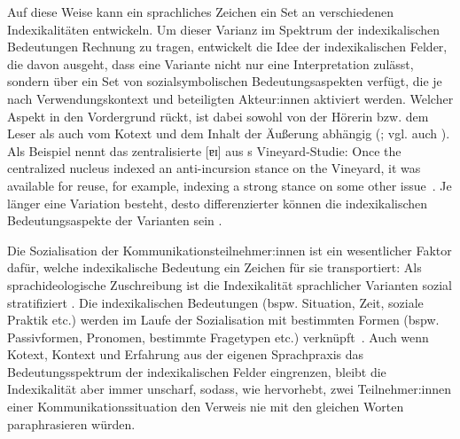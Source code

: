 Auf diese Weise kann ein sprachliches Zeichen ein Set an verschiedenen Indexikalitäten entwickeln. 
Um dieser Varianz im Spektrum der indexikalischen Bedeutungen Rechnung zu tragen, entwickelt \citet{Eckert2008} die Idee der indexikalischen Felder, die davon ausgeht, dass eine Variante nicht nur eine Interpretation zulässt, sondern über ein Set von sozialsymbolischen Bedeutungsaspekten verfügt, die je nach Verwendungskontext und beteiligten Akteur:innen aktiviert werden. 
Welcher Aspekt in den Vordergrund rückt, ist dabei sowohl von der Hörerin bzw. dem Leser als auch vom Kotext und dem Inhalt der Äußerung abhängig (\citealp[s.][466]{Eckert2008}; vgl. auch \cites[45]{Gumperz.1992b}[414]{Ochs1996}). 
Als Beispiel nennt \citet[72]{Eckert.2016} das zentralisierte [ɐɪ] aus \citeauthor{Labov1963}s \citeyear{Labov1963} Vineyard-Studie: {\glqq}Once the centralized nucleus indexed an anti-incursion stance on the Vineyard, it was available for reuse, for example, indexing a strong stance on some other issue{\grqq}~\citep[72]{Eckert.2016}.
Je länger eine Variation besteht, desto differenzierter können die indexikalischen Bedeutungsaspekte der Varianten sein \citep[s.][471]{Eckert2008}.

Die Sozialisation der Kommunikationsteilnehmer:innen ist ein wesentlicher Faktor dafür, welche indexikalische Bedeutung ein Zeichen für sie transportiert: 
Als sprachideologische Zuschreibung ist die Indexikalität sprachlicher Varianten sozial stratifiziert \citep[s.][265]{Spitzmuller2013}. 
Die indexikalischen Bedeutungen (bspw. Situation, Zeit, soziale Praktik etc.) werden im Laufe der Sozialisation  mit bestimmten Formen (bspw. Passivformen, Pronomen, bestimmte Fragetypen etc.) verkn{\"u}pft~\citep[s.][410--411]{Ochs1996}.
Auch wenn Kotext, Kontext und Erfahrung aus der eigenen Sprachpraxis das Bedeutungsspektrum der indexikalischen Felder eingrenzen, bleibt die Indexikalität aber immer unscharf, sodass, wie \citet[12--13]{Auer.1995} hervorhebt, zwei Teilnehmer:innen einer Kommunikationssituation den Verweis nie mit den gleichen Worten paraphrasieren würden. 

